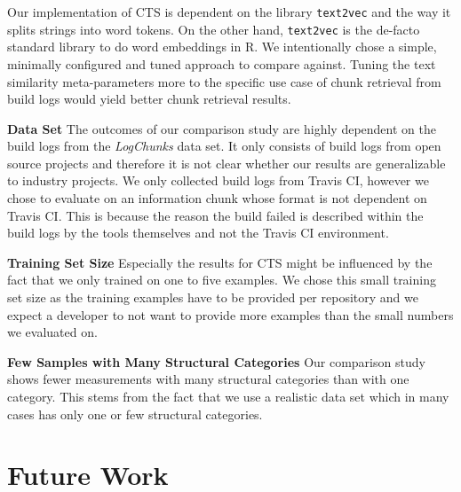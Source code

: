 Our implementation of CTS is dependent on the library {\tt text2vec} and the way it splits strings into word tokens. On the other hand, {\tt text2vec} is the de-facto standard library to do word embeddings in R.
We intentionally chose a simple, minimally configured and tuned approach to compare against.
Tuning the text similarity meta-parameters more to the specific use case of chunk retrieval from build logs would yield better chunk retrieval results.

\noindent
\textbf{Data Set}
The outcomes of our comparison study are highly dependent on the build logs from the \emph{LogChunks} data set.
It only consists of build logs from open source projects and therefore it is not clear whether our results are generalizable to industry projects.
We only collected build logs from Travis CI, however we chose to evaluate on an information chunk whose format is not dependent on Travis CI\@.
This is because the reason the build failed is described within the build logs by the tools themselves and not the Travis CI environment.

\noindent
\textbf{Training Set Size}
Especially the results for CTS might be influenced by the fact that we only trained on one to five examples.
We chose this small training set size as the training examples have to be provided per repository and we expect a developer to not want to provide more examples than the small numbers we evaluated on.

\noindent
\textbf{Few Samples with Many Structural Categories}
Our comparison study shows fewer measurements with many structural categories than with one category.
This stems from the fact that we use a realistic data set which in many cases has only one or few structural categories.

\section{Future Work}

